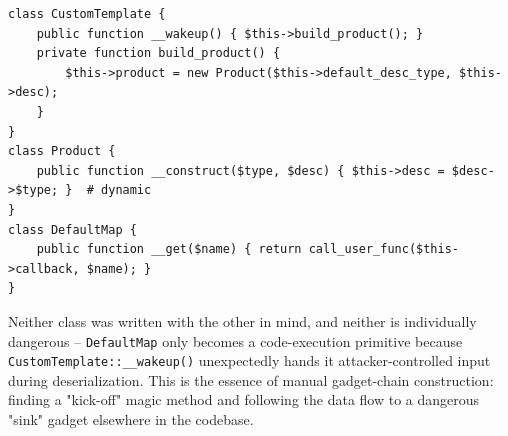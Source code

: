 \documentclass[11pt]{article}
\begin{document}
\begin{causebox}
\begin{lstlisting}[style=code]
class CustomTemplate {
    public function __wakeup() { $this->build_product(); }
    private function build_product() {
        $this->product = new Product($this->default_desc_type, $this->desc);
    }
}
class Product {
    public function __construct($type, $desc) { $this->desc = $desc->$type; }  # dynamic
}
class DefaultMap {
    public function __get($name) { return call_user_func($this->callback, $name); }
}
\end{lstlisting}
Neither class was written with the other in mind, and neither is individually dangerous -- \texttt{DefaultMap} only becomes a code-execution primitive because \texttt{CustomTemplate::\_\_wakeup()} unexpectedly hands it attacker-controlled input during deserialization. This is the essence of manual gadget-chain construction: finding a "kick-off" magic method and following the data flow to a dangerous "sink" gadget elsewhere in the codebase.
\end{causebox}
\end{document}

